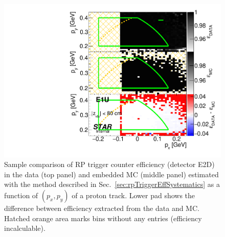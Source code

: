 \begin{figure}[h]%
	\centering
	\parbox{0.4725\textwidth}{
		\centering
		\includegraphics[width=\linewidth,page=4]{graphics/systematicsEfficiency/RpSyst/relativeTriggerEff2D_pxpy.pdf}%
	}
	\quad
	\parbox{0.4725\textwidth}{
		\centering\vspace*{-100pt}
		\caption[Coparison of estimated RP trigger counter efficiency in 2D (detector E2D).]%
    {Sample comparison of RP trigger counter efficiency (detector E2D) in the data (top panel) and embedded MC (middle panel) estimated with the method described in Sec.~\ref{sec:rpTriggerEffSystematics} as a function of $(p_{x},p_{y})$ of a proton track. Lower pad shows the difference between efficiency extracted from the data and MC. Hatched orange area marks bins without any entries (efficiency incalculable).%
    }
	}
	\label{fig:relativeRpRecoEff_E2D}
\end{figure}




